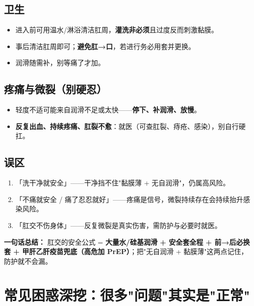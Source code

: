 \documentclass[12pt,UTF8,openany]{ctexbook}
\begin{document}
\section{卫生}

\begin{itemize}[leftmargin=2em,itemsep=0.3em]
  \item 进入前可用温水/淋浴清洁肛周，\textbf{灌洗非必须}且过度反而刺激黏膜。
  \item 事后清洁肛周即可；\textbf{避免肛→口}，若进行务必用套并更换。
  \item 润滑随需补，别等痛了才加。
\end{itemize}

\section{疼痛与微裂（别硬忍）}

\begin{itemize}[leftmargin=2em,itemsep=0.3em]
  \item 轻度不适可能来自润滑不足或太快——\textbf{停下、补润滑、放慢}。
  \item \textbf{反复出血、持续疼痛、肛裂不愈}：就医（可查肛裂、痔疮、感染），别自行硬扛。
\end{itemize}

\section{误区}

\begin{enumerate}[leftmargin=2em,itemsep=0.3em]
  \item 「洗干净就安全」——干净挡不住"黏膜薄 + 无自润滑"，仍属高风险。
  \item 「不痛就安全 / 痛了忍忍就好」——疼痛是信号，微裂持续存在会持续抬升感染风险。
  \item 「肛交不伤身体」——反复微裂是真实伤害，需防护与必要时就医。
\end{enumerate}

\vspace{1em}
\noindent\textbf{一句话总结：} 肛交的安全公式 = \textbf{大量水/硅基润滑 + 安全套全程 + 前→后必换套 + 甲肝乙肝疫苗兜底（高危加 PrEP）}；把"无自润滑 + 黏膜薄"这两点记住，防护就不会漏。

\chapter{常见困惑深挖：很多"问题"其实是"正常"}
\label{chap:concerns}
\end{document}
